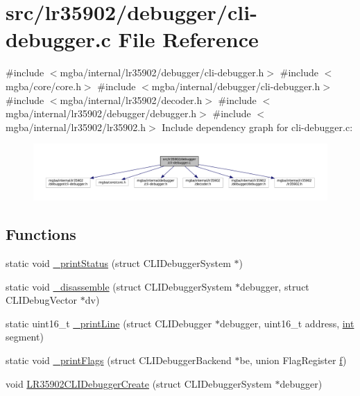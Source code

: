 \hypertarget{lr35902_2debugger_2cli-debugger_8c}{}\section{src/lr35902/debugger/cli-\/debugger.c File Reference}
\label{lr35902_2debugger_2cli-debugger_8c}
{\ttfamily \#include $<$mgba/internal/lr35902/debugger/cli-\/debugger.\+h$>$}\newline
{\ttfamily \#include $<$mgba/core/core.\+h$>$}\newline
{\ttfamily \#include $<$mgba/internal/debugger/cli-\/debugger.\+h$>$}\newline
{\ttfamily \#include $<$mgba/internal/lr35902/decoder.\+h$>$}\newline
{\ttfamily \#include $<$mgba/internal/lr35902/debugger/debugger.\+h$>$}\newline
{\ttfamily \#include $<$mgba/internal/lr35902/lr35902.\+h$>$}\newline
Include dependency graph for cli-\/debugger.c\+:
\nopagebreak
\begin{figure}[H]
\begin{center}
\leavevmode
\includegraphics[width=350pt]{lr35902_2debugger_2cli-debugger_8c__incl}
\end{center}
\end{figure}
\subsection*{Functions}
\begin{DoxyCompactItemize}
\item 
static void \mbox{\hyperlink{lr35902_2debugger_2cli-debugger_8c_a1bce4490785068fd42fca65db1fb21ad}{\+\_\+print\+Status}} (struct C\+L\+I\+Debugger\+System $\ast$)
\item 
static void \mbox{\hyperlink{lr35902_2debugger_2cli-debugger_8c_ab744a20db75c627a6cf552eee9339cc0}{\+\_\+disassemble}} (struct C\+L\+I\+Debugger\+System $\ast$debugger, struct C\+L\+I\+Debug\+Vector $\ast$dv)
\item 
static uint16\+\_\+t \mbox{\hyperlink{lr35902_2debugger_2cli-debugger_8c_a565a93fd2698bb6df9b06c322025a6cc}{\+\_\+print\+Line}} (struct C\+L\+I\+Debugger $\ast$debugger, uint16\+\_\+t address, \mbox{\hyperlink{ioapi_8h_a787fa3cf048117ba7123753c1e74fcd6}{int}} segment)
\item 
static void \mbox{\hyperlink{lr35902_2debugger_2cli-debugger_8c_a6f66f89891de505acabfc2381290bd70}{\+\_\+print\+Flags}} (struct C\+L\+I\+Debugger\+Backend $\ast$be, union Flag\+Register \mbox{\hyperlink{isa-arm_8c_a362077c979b0bb65159c603270e40f70}{f}})
\item 
void \mbox{\hyperlink{lr35902_2debugger_2cli-debugger_8c_ac552e15579f9549416a7d86250b83460}{L\+R35902\+C\+L\+I\+Debugger\+Create}} (struct C\+L\+I\+Debugger\+System $\ast$debugger)
\end{DoxyCompactItemize}
